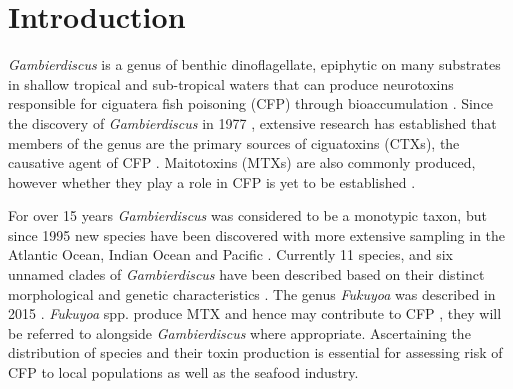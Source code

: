 \documentclass[12pt]{article}
\begin{document}
\newpage

\section{Introduction}

\emph{Gambierdiscus} is a genus of benthic dinoflagellate, epiphytic on many substrates in shallow tropical and sub-tropical waters that can produce neurotoxins responsible for ciguatera fish poisoning (CFP) through bioaccumulation \citep{berdalet2012global}. 
Since the discovery of \emph{Gambierdiscus} in 1977 \citep{yasumoto1977finding}, extensive research has established that members of the genus are the primary sources of ciguatoxins (CTXs), the causative agent of CFP \citep{chinain1997intraspecific,holmes1998gambierdiscus}. Maitotoxins (MTXs) are also commonly produced, however whether they play a role in CFP is yet to be established \citep{kohli2014feeding}. 

For over 15 years \emph{Gambierdiscus} was considered to be a monotypic taxon, but since 1995 new species have been discovered with more extensive sampling in the Atlantic Ocean, Indian Ocean and Pacific \citep{faust1995observation,holmes1998gambierdiscus,litaker2009taxonomy,chinain1999morphology,fraga2011gambierdiscus,nishimura2014morphology}.
Currently 11 species, and six unnamed clades of \emph{Gambierdiscus} have been described based on their distinct morphological and genetic characteristics \citep{adachi1979thecal,faust1995observation,chinain1999morphology,litaker2009taxonomy,nishimura2014morphology,fraga2011gambierdiscus}.  
The genus \emph{Fukuyoa} was described in 2015 \citep{gomez2015fukuyoa}. \emph{Fukuyoa} spp. produce MTX \citep{holmes1998gambierdiscus,holland2013differences} and hence may contribute to CFP \citep{kohli2014feeding}, they will be referred to alongside \emph{Gambierdiscus} where appropriate.
Ascertaining the distribution of species and their toxin production is essential for assessing risk of CFP to local populations as well as the seafood industry.
\end{document}
